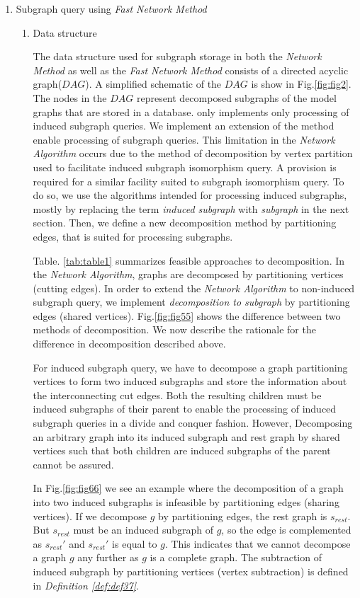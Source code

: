 \begin{enumerate}
\begin{enumerate}
\end{enumerate}

\item  Subgraph query using \textit{Fast Network Method}

\begin{enumerate}

\item Data structure

The data structure used for subgraph storage in both the \textit{Network Method} as well as the \textit{Fast Network Method} consists of a directed acyclic graph($DAG$). 
A simplified schematic of the $DAG$ is show in Fig.\ref{fig:fig2}. 
The nodes in the $DAG$ represent decomposed subgraphs of the model graphs that are stored in a database. 
only implements only processing of induced subgraph queries. 
We implement an extension of the method enable processing of subgraph queries. 
This limitation in the \textit{Network Algorithm} occurs due to the method of decomposition by vertex partition used to facilitate induced subgraph isomorphism query. 
A provision is required for a similar facility suited to subgraph isomorphism query. 
To do so, we use the algorithms intended for processing induced subgraphs, mostly by replacing the term \textit{induced subgraph} with \textit{subgraph} in the next section.
Then, we define a new decomposition method by partitioning edges, that is suited for processing subgraphs.


Table. \ref{tab:table1} summarizes feasible approaches to decomposition. 
In the \textit{Network Algorithm}, graphs are decomposed by partitioning vertices (cutting edges).
In order to extend the \textit{Network Algorithm} to non-induced subgraph query, we implement \textit{decomposition to subgraph} by partitioning edges (shared vertices). 
Fig.\ref{fig:fig55} shows the difference between two methods of decomposition. 
We now describe the rationale for the difference in decomposition described above.

For induced subgraph query, we have to decompose a graph partitioning vertices to form two induced subgraphs and store the information about the interconnecting cut edges. 
Both the resulting children must be induced subgraphs of their parent to enable the processing of induced subgraph queries in a divide and conquer fashion. 
However, Decomposing an arbitrary graph into its induced subgraph and rest graph by shared vertices such that both children are induced subgraphs of the parent cannot be assured.

In Fig.\ref{fig:fig66} we see an example where the decomposition of a graph into two induced subgraphs is infeasible by partitioning edges (sharing vertices).
If we decompose $g$ by partitioning edges, the rest graph is $s_{rest}$. But $s_{rest}$ must be an induced subgraph of $g$, so the edge is complemented as $s_{rest}'$ and $s_{rest}'$ is equal to $g$. 
This indicates that we cannot decompose a graph $g$ any further as $g$ is a complete graph.
The subtraction of induced subgraph by partitioning vertices (vertex subtraction)  is defined in \textit{Definition \ref{def:def37}}.


\end{enumerate}
\end{enumerate}
